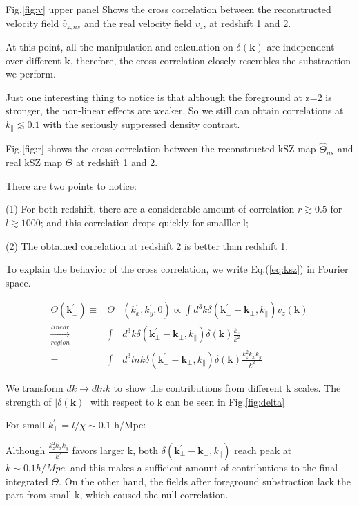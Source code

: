 Fig.\ref{fig:v} upper panel Shows the cross correlation between 
the reconstructed velocity field $\hat v_{z,ns}$ and the real velocity field $v_z$, at redshift 1 and 2. 

At this point, all the manipulation and calculation on $\delta(\bm{k})$ are independent over different $\bm{k}$, 
therefore, the cross-correlation closely resembles the substraction we perform. 

Just one interesting thing to notice is that although the foreground at z=2 is stronger, 
the non-linear effects are weaker.  
So we still can obtain correlations at $k_\parallel \lesssim 0.1$ with the seriously suppressed density contrast. 

Fig.\ref{fig:r} shows the cross correlation between the reconstructed kSZ map 
$\hat\Theta_{ns}$ and real kSZ map $\Theta$ at redshift 1 and 2. 

There are two points to notice: 

(1) For both redshift, there are a considerable amount of correlation 
$r\gtrsim0.5$ for $l\gtrsim 1000$; 
and this correlation drops quickly for smalller l; 

(2) The obtained correlation at redshift 2 is better than redshift 1.

To explain the behavior of the cross correlation, we write Eq.(\ref{eq:ksz}) in Fourier space.

\begin{eqnarray}
    \Theta(\bm{k_\perp^{\prime}})\equiv&\Theta&(k_x^{\prime},k_y^{\prime},0)\propto\int d^3k\delta(\bm{k_\perp^{\prime}}-\bm{k_\perp},k_\parallel) v_z(\bm{k})\nonumber\\
    \xrightarrow[region]{linear}&\int& d^3k\delta(\bm{k_\perp^{\prime}}-\bm{k_\perp},k_\parallel)\delta(\bm{k})\frac{k_z}{k^2}\\
    =&\int&d^3lnk\delta(\bm{k_\perp^{\prime}}-\bm{k_\perp},k_\parallel)\delta(\bm{k})\frac{k_z^2k_xk_y}{k^2}\nonumber
    \end{eqnarray}

    We transform $dk\rightarrow dlnk$ 
    to show the contributions from different k scales.
    The strength of $|\delta(\bm{k})|$ with respect to k can be seen in Fig.\ref{fig:delta}

For small $k_\perp^\prime=l/\chi\sim 0.1$ h/Mpc:

Although $\frac{k_z^2k_xk_y}{k^2}$ favors larger k, both $\delta(\bm{k_\perp^{\prime}}-\bm{k_\perp},k_\parallel)$  
reach peak at $k\sim 0.1 h/Mpc$.
and this makes a sufficient amount of contributions to the final integrated $\Theta$. 
On the other hand, the fields after foreground substraction lack the part from 
small k, which caused the null correlation.

